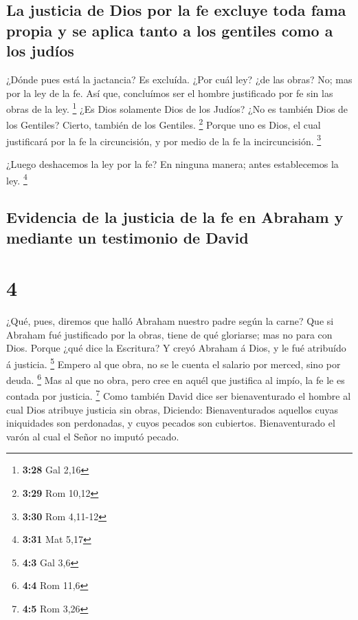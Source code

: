 \hypertarget{la-justicia-de-dios-por-la-fe-excluye-toda-fama-propia-y-se-aplica-tanto-a-los-gentiles-como-a-los-juduxedos}{%
\subsection{La justicia de Dios por la fe excluye toda fama propia y se
aplica tanto a los gentiles como a los
judíos}\label{la-justicia-de-dios-por-la-fe-excluye-toda-fama-propia-y-se-aplica-tanto-a-los-gentiles-como-a-los-juduxedos}}

 ¿Dónde pues está la jactancia? Es excluída. ¿Por cuál
ley? ¿de las obras? No; mas por la ley de la fe.  Así
que, concluímos ser el hombre justificado por fe sin las obras de la
ley. \footnote{\textbf{3:28} Gal 2,16}  ¿Es Dios
solamente Dios de los Judíos? ¿No es también Dios de los Gentiles?
Cierto, también de los Gentiles. \footnote{\textbf{3:29} Rom 10,12}
 Porque uno es Dios, el cual justificará por la fe la
circuncisión, y por medio de la fe la incircuncisión. \footnote{\textbf{3:30}
  Rom 4,11-12}

 ¿Luego deshacemos la ley por la fe? En ninguna manera;
antes establecemos la ley. \footnote{\textbf{3:31} Mat 5,17}

\hypertarget{evidencia-de-la-justicia-de-la-fe-en-abraham-y-mediante-un-testimonio-de-david}{%
\subsection{Evidencia de la justicia de la fe en Abraham y mediante un
testimonio de
David}\label{evidencia-de-la-justicia-de-la-fe-en-abraham-y-mediante-un-testimonio-de-david}}

\hypertarget{section-3}{%
\section{4}\label{section-3}}

 ¿Qué, pues, diremos que halló Abraham nuestro padre según
la carne?  Que si Abraham fué justificado por la obras,
tiene de qué gloriarse; mas no para con Dios.  Porque ¿qué
dice la Escritura? Y creyó Abraham á Dios, y le fué atribuído á
justicia. \footnote{\textbf{4:3} Gal 3,6}  Empero al que
obra, no se le cuenta el salario por merced, sino por deuda. \footnote{\textbf{4:4}
  Rom 11,6}  Mas al que no obra, pero cree en aquél que
justifica al impío, la fe le es contada por justicia. \footnote{\textbf{4:5}
  Rom 3,26}  Como también David dice ser bienaventurado el
hombre al cual Dios atribuye justicia sin obras, 
Diciendo: Bienaventurados aquellos cuyas iniquidades son perdonadas, y
cuyos pecados son cubiertos.  Bienaventurado el varón al
cual el Señor no imputó pecado.

